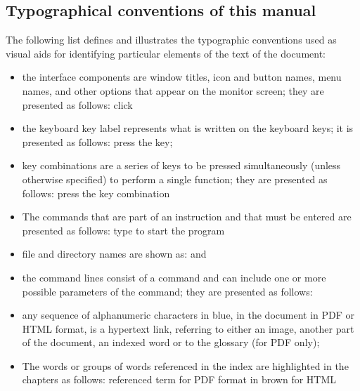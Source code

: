 \subsection{Typographical conventions of this manual \label{introduction-manual-conventions}}

The following list defines and illustrates the typographic conventions used as visual aids for identifying particular elements of the text of the document:

\begin{itemize}
	\item the interface components are window titles, icon and button names, menu names, and other options that appear on the monitor screen; they are presented as follows: \newline
	\hspace*{1.5cm} click 
	\item the keyboard key label represents what is written on the keyboard keys; it is presented as follows: \newline
	\hspace*{1.5cm} press the  key;
	\item key combinations are a series of keys to be pressed simultaneously (unless otherwise specified) to perform a single function; they are presented as follows: \newline
	\hspace*{1.5cm} press the key combination  
	\item The commands that are part of an instruction and that must be entered are presented as follows:\newline
	\hspace*{1.5cm} type  to start the program
	\item file and directory names are shown as: \newline
	\hspace*{1.5cm}  and 
	\item the command lines consist of a command and can include one or more possible parameters of the command; they are presented as follows: \newline
	\hspace*{1.5cm} 
	\item any sequence of alphanumeric characters in blue, in the document in PDF or HTML format, is a hypertext link, referring to either an image, another part of the document, an indexed word or to the glossary (for PDF only);
	\item The words or groups of words referenced in the index are highlighted in the chapters as follows:\newline
	\hspace*{1.5cm} \textsf{referenced term} for \gls{PDF} format \newline
	\hspace*{1.5cm} in brown for \gls{HTML}
\end{itemize}

